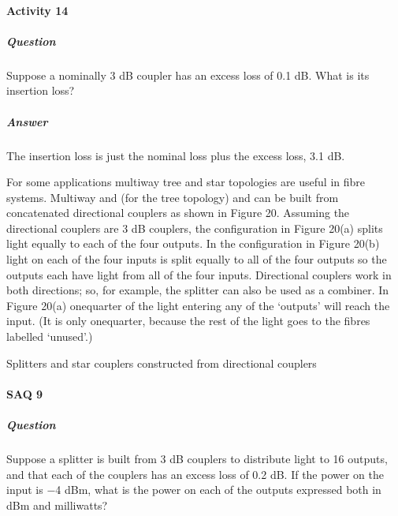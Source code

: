 \documentclass[letterpaper,10pt,english]{sphinxmanual}
\let\sphinxpxdimen\pdfpxdimen\else\newdimen\sphinxpxdimen
\begin{document}
\paragraph{Activity 14}
\label{\detokenize{content/session_00/Part_00_03:Activity-14}}

\subparagraph{Question}
\label{\detokenize{content/session_00/Part_00_03:id1}}
Suppose a nominally 3 dB coupler has an excess loss of 0.1 dB. What is its insertion loss?


\subparagraph{Answer}
\label{\detokenize{content/session_00/Part_00_03:id2}}
The insertion loss is just the nominal loss plus the excess loss, 3.1 dB.

For some applications multi\sphinxhyphen{}way tree and star topologies are useful in fibre systems. Multi\sphinxhyphen{}way  and  (for the tree topology) and  can be built from concatenated directional couplers as shown in Figure 20. Assuming the directional couplers are 3 dB couplers, the configuration in Figure 20(a) splits light equally to each of the four outputs. In the configuration in Figure 20(b) light on each of the four inputs is split equally to all of the four outputs \textendash{} so
the outputs each have light from all of the four inputs. Directional couplers work in both directions; so, for example, the splitter can also be used as a combiner. In Figure 20(a) one\sphinxhyphen{}quarter of the light entering any of the ‘outputs’ will reach the input. (It is only one\sphinxhyphen{}quarter, because the rest of the light goes to the fibres labelled ‘unused’.)

\sphinxincludegraphics[width=511\sphinxpxdimen,height=770\sphinxpxdimen]{{t305_020i}.jpg}

Splitters and star couplers constructed from directional couplers




\paragraph{SAQ 9}
\label{\detokenize{content/session_00/Part_00_03:SAQ-9}}

\subparagraph{Question}
\label{\detokenize{content/session_00/Part_00_03:id3}}
Suppose a splitter is built from 3 dB couplers to distribute light to 16 outputs, and that each of the couplers has an excess loss of 0.2 dB. If the power on the input is −4 dBm, what is the power on each of the outputs expressed both in dBm and milliwatts?
\end{document}
